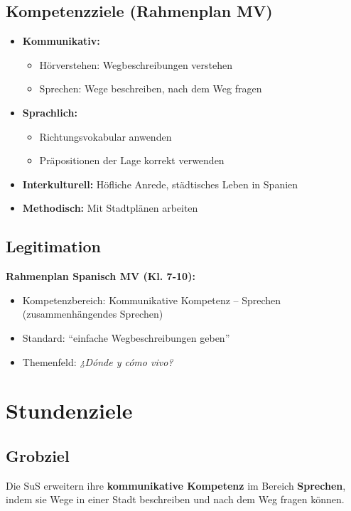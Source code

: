 \documentclass[11pt,a4paper]{article}
\begin{document}
\subsection{Kompetenzziele (Rahmenplan MV)}
\begin{itemize}
    \item \textbf{Kommunikativ:}
    \begin{itemize}
        \item Hörverstehen: Wegbeschreibungen verstehen
        \item Sprechen: Wege beschreiben, nach dem Weg fragen
    \end{itemize}
    \item \textbf{Sprachlich:}
    \begin{itemize}
        \item Richtungsvokabular anwenden
        \item Präpositionen der Lage korrekt verwenden
    \end{itemize}
    \item \textbf{Interkulturell:} Höfliche Anrede, städtisches Leben in Spanien
    \item \textbf{Methodisch:} Mit Stadtplänen arbeiten
\end{itemize}

\subsection{Legitimation}
\textbf{Rahmenplan Spanisch MV (Kl. 7-10):}
\begin{itemize}
    \item Kompetenzbereich: Kommunikative Kompetenz -- Sprechen (zusammenhängendes Sprechen)
    \item Standard: ``einfache Wegbeschreibungen geben''
    \item Themenfeld: \textit{¿Dónde y cómo vivo?}
\end{itemize}

\section{Stundenziele}

\subsection{Grobziel}
Die SuS erweitern ihre \textbf{kommunikative Kompetenz} im Bereich \textbf{Sprechen}, indem sie Wege in einer Stadt beschreiben und nach dem Weg fragen können.
\end{document}

